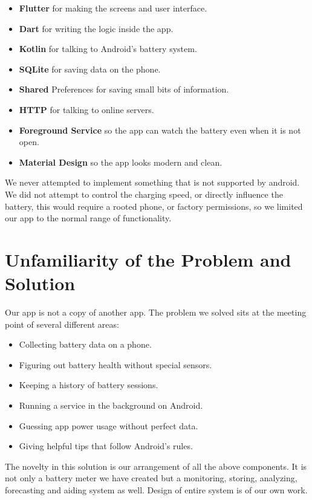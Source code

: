 \documentclass[12pt,a4paper]{report}
\begin{document}
\begin{itemize}
    \item \textbf{Flutter} for making the screens and user interface.
    \item \textbf{Dart} for writing the logic inside the app.
    \item \textbf{Kotlin} for talking to Android's battery system.
    \item \textbf{SQLite} for saving data on the phone.
    \item \textbf{Shared} Preferences for saving small bits of information.
    \item \textbf{HTTP} for talking to online servers.
    \item \textbf{Foreground Service} so the app can watch the battery even when it is not open.
    \item \textbf{Material Design} so the app looks modern and clean.
\end{itemize}

We never attempted to implement something that is not supported by android. We did not attempt to control the charging speed, or directly influence the battery, this would require a rooted phone, or factory permissions, so we limited our app to the normal range of functionality.

\section{Unfamiliarity of the Problem and Solution}

Our app is not a copy of another app. The problem we solved sits at the meeting point of several different areas:

\begin{itemize}
    \item Collecting battery data on a phone.
    \item Figuring out battery health without special sensors.
    \item Keeping a history of battery sessions.
    \item Running a service in the background on Android.
    \item Guessing app power usage without perfect data.
    \item Giving helpful tips that follow Android's rules.
\end{itemize}

The novelty in this solution is our arrangement of all the above components. It is not only a battery meter we have created but a monitoring, storing, analyzing, forecasting and aiding system as well. Design of entire system is of our own work.
\end{document}
